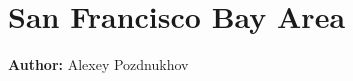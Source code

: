 \section{San Francisco Bay Area}
\label{ch:scenarios:sf}
\hfill \textbf{Author:} Alexey Pozdnukhov


